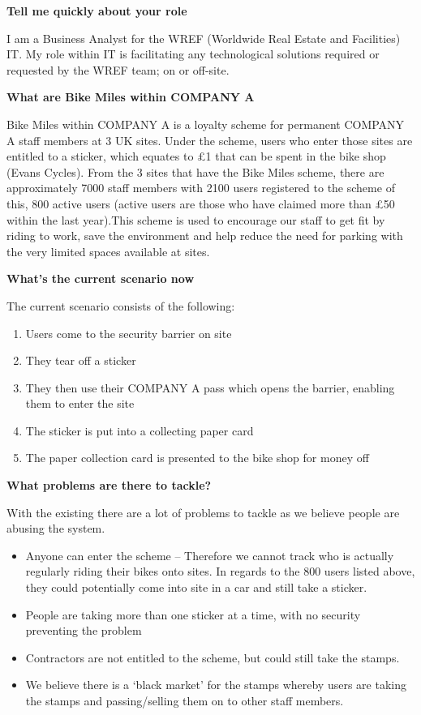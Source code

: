 \textbf{Tell me quickly about your role}

I am a Business Analyst for the WREF (Worldwide Real Estate and Facilities) IT. My role within IT is facilitating any technological solutions required or requested by the WREF team; on or off-site.

\textbf{What are Bike Miles within COMPANY A}

Bike Miles within COMPANY A is a loyalty scheme for permanent COMPANY A staff members at 3 UK sites. Under the scheme, users who enter those sites are entitled to a sticker, which equates to £1 that can be spent in the bike shop (Evans Cycles). From the 3 sites that have the Bike Miles scheme, there are approximately 7000 staff members with 2100 users registered to the scheme of this, 800 active users (active users are those who have claimed more than £50 within the last year).This scheme is used to encourage our staff to get fit by riding to work, save the environment and help reduce the need for parking with the very limited spaces available at sites.

\textbf{What's the current scenario now}

The current scenario consists of the following:
\begin{enumerate}
\item Users come to the security barrier on site
\item They tear off a sticker
\item They then use their COMPANY A pass which opens the barrier, enabling them to enter the site
\item The sticker is put into a collecting paper card
\item The paper collection card is presented to the bike shop for money off 
\end{enumerate}

\textbf{What problems are there to tackle?}

With the existing there are a lot of problems to tackle as we believe people are abusing the system.
\begin{itemize}
\item Anyone can enter the scheme – Therefore we cannot track who is actually regularly riding their bikes onto sites. In regards to the 800 users listed above, they could potentially come into site in a car and still take a sticker.
\item People are taking more than one sticker at a time, with no security preventing the problem
\item Contractors are not entitled to the scheme, but could still take the stamps.
\item We believe there is a ‘black market’ for the stamps whereby users are taking the stamps and passing/selling them on to other staff members.
\end{itemize}

